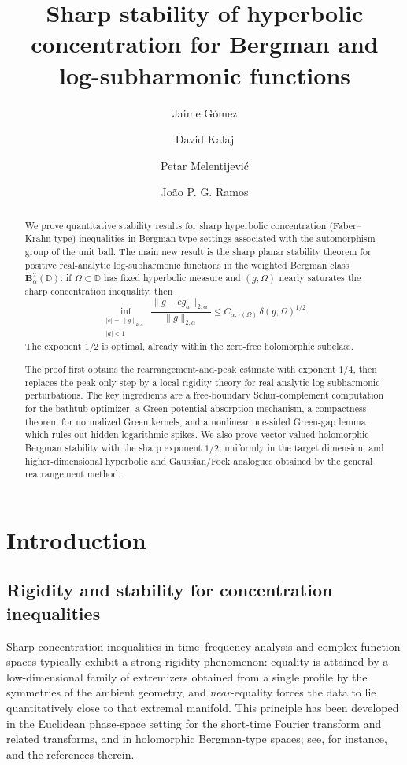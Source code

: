 \documentclass[a4paper,10pt]{amsart}
\title[Sharp stability of hyperbolic concentration]{Sharp stability of hyperbolic concentration for Bergman and log-subharmonic functions}
\author{Jaime G\'omez}
\author{David Kalaj}
\author{Petar Melentijevi\'c}
\author{Jo\~ao P. G. Ramos}
\newcommand{\D}{\mathbb{D}}
\begin{document}
\begin{abstract}
We prove quantitative stability results for sharp hyperbolic concentration
(Faber--Krahn type) inequalities in Bergman-type settings associated with the
automorphism group of the unit ball. The main new result is the sharp planar
stability theorem for positive real-analytic log-subharmonic functions in the
weighted Bergman class $\mathbf B_\alpha^2(\D)$: if
$\Omega\subset\D$ has fixed hyperbolic measure and $(g,\Omega)$ nearly
saturates the sharp concentration inequality, then
\[
\inf_{\substack{|c|=\|g\|_{2,\alpha}\\ |a|<1}}
\frac{\|g-cg_a\|_{2,\alpha}}{\|g\|_{2,\alpha}}
\le
C_{\alpha,\tau(\Omega)}\,\delta(g;\Omega)^{1/2}.
\]
The exponent $1/2$ is optimal, already within the zero-free holomorphic
subclass.

The proof first obtains the rearrangement-and-peak estimate with exponent
$1/4$, then replaces the peak-only step by a local rigidity theory for
real-analytic log-subharmonic perturbations. The key ingredients are a
free-boundary Schur-complement computation for the bathtub optimizer, a
Green-potential absorption mechanism, a compactness theorem for normalized
Green kernels, and a nonlinear one-sided Green-gap lemma which rules out
hidden logarithmic spikes. We also prove vector-valued holomorphic Bergman
stability with the sharp exponent $1/2$, uniformly in the target dimension,
and higher-dimensional hyperbolic and Gaussian/Fock analogues obtained by the
general rearrangement method.
\end{abstract}
\maketitle
\section{Introduction}

\subsection{Rigidity and stability for concentration inequalities}

Sharp concentration inequalities in time--frequency analysis and complex function spaces typically
exhibit a strong rigidity phenomenon: equality is attained by a low-dimensional family of
extremizers obtained from a single profile by the symmetries of the ambient geometry, and
\emph{near}-equality forces the data to lie quantitatively close to that extremal manifold.
This principle has been developed in the Euclidean phase-space setting for the short-time Fourier
transform and related transforms, and in holomorphic Bergman-type spaces; see, for instance,
\cite{GomezGuerraRamosTilli2024,GomezKalajMelentijevicRamos2025} and the references therein.
\end{document}
